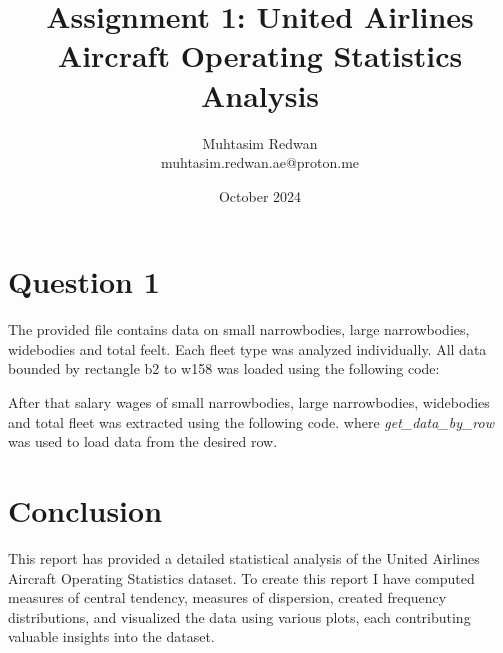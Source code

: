 \documentclass[a4paper,12pt]{article}
\title{Assignment 1: United Airlines Aircraft Operating Statistics Analysis}
\author{Muhtasim Redwan \\ muhtasim.redwan.ae@proton.me}
\date{October 2024}
\begin{document}

\maketitle




\section{Question 1}
The provided file contains data on small narrowbodies, large narrowbodies, widebodies and total feelt. Each fleet
type was analyzed individually. All data bounded by rectangle b2 to w158 was loaded using the following code:


After that salary wages of small narrowbodies, large narrowbodies, widebodies and total fleet was extracted using the following code. where \textit{get\_data\_by\_row} was used to load data from the desired row.








\section*{Conclusion}
This report has provided a detailed statistical analysis of the United Airlines Aircraft Operating Statistics dataset. To create this report I have computed measures of central tendency, measures of dispersion, created frequency distributions, and visualized the data using various plots, each contributing valuable insights into the dataset.
\end{document}
